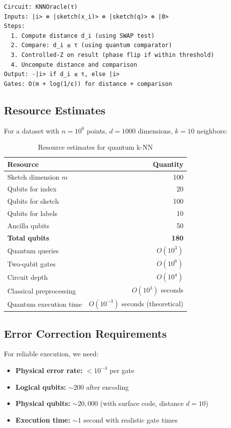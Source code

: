 \documentclass[11pt]{article}
\begin{document}
\begin{verbatim}
Circuit: KNNOracle(τ)
Inputs: |i> ⊗ |sketch(x_i)> ⊗ |sketch(q)> ⊗ |0>
Steps:
  1. Compute distance d_i (using SWAP test)
  2. Compare: d_i ≤ τ (using quantum comparator)
  3. Controlled-Z on result (phase flip if within threshold)
  4. Uncompute distance and comparison
Output: -|i> if d_i ≤ τ, else |i>
Gates: O(m + log(1/ε)) for distance + comparison
\end{verbatim}

\subsection{Resource Estimates}

For a dataset with $n=10^6$ points, $d=1000$ dimensions, $k=10$ neighbors:

\begin{table}[ht]
\centering
\caption{Resource estimates for quantum k-NN}
\begin{tabular}{lr}
\toprule
\textbf{Resource} & \textbf{Quantity} \\
\midrule
Sketch dimension $m$ & 100 \\
Qubits for index & 20 \\
Qubits for sketch & 100 \\
Qubits for labels & 10 \\
Ancilla qubits & 50 \\
\midrule
\textbf{Total qubits} & \textbf{180} \\
\midrule
Quantum queries & $O(10^3)$ \\
Two-qubit gates & $O(10^6)$ \\
Circuit depth & $O(10^4)$ \\
\midrule
Classical preprocessing & $O(10^3)$ seconds \\
Quantum execution time & $O(10^{-3})$ seconds (theoretical) \\
\bottomrule
\end{tabular}
\label{tab:resources}
\end{table}

\subsection{Error Correction Requirements}

For reliable execution, we need:
\begin{itemize}
    \item \textbf{Physical error rate:} $< 10^{-4}$ per gate
    \item \textbf{Logical qubits:} $\sim 200$ after encoding
    \item \textbf{Physical qubits:} $\sim 20,000$ (with surface code, distance $d=10$)
    \item \textbf{Execution time:} $\sim 1$ second with realistic gate times
\end{itemize}
\end{document}
